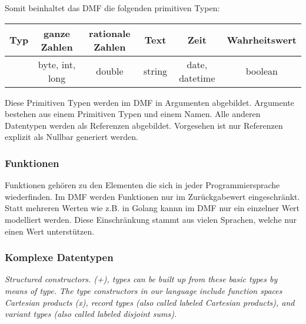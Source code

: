 \documentclass[./einleitung.tex]{subfiles}
\begin{document}
Somit beinhaltet das DMF die folgenden primitiven Typen:

\begin{center}
\begin{tabular}{| c || c | c | c | c | c |}
\hline
Typ & ganze Zahlen & rationale Zahlen & Text & Zeit & Wahrheitswert \\
\hline
& byte, int, long & double & string & date, datetime & boolean \\
\hline
\end{tabular}
\end{center}

Diese Primitiven Typen werden im DMF in Argumenten abgebildet. Argumente bestehen aus einem Primitiven Typen und einem Namen.
Alle anderen Datentypen werden als Referenzen abgebildet. 
Vorgesehen ist nur Referenzen explizit als Nullbar generiert werden.

\subsubsection{Funktionen}
Funktionen gehören zu den Elementen die sich in jeder Programmiersprache wiederfinden.
Im DMF werden Funktionen nur im Zurückgabewert eingeschränkt. Statt mehreren Werten wie z.B. in Golang kannn im DMF nur ein einzelner Wert modelliert werden. Diese Einschränkung stammt aus vielen Sprachen, welche nur einen Wert unterstützen.

\subsubsection{Komplexe Datentypen}
\begin{center}
 \textit{Structured constructors. (+), types can be built up from these basic types by means of type. The type constructors in 
our language include function spaces Cartesian products (x), record types (also called labeled  Cartesian products), and variant types (also called labeled disjoint sums).\cite{https://dl.acm.org/doi/pdf/10.1145/6041.6042}}
 \end{center}
 
\end{document}
